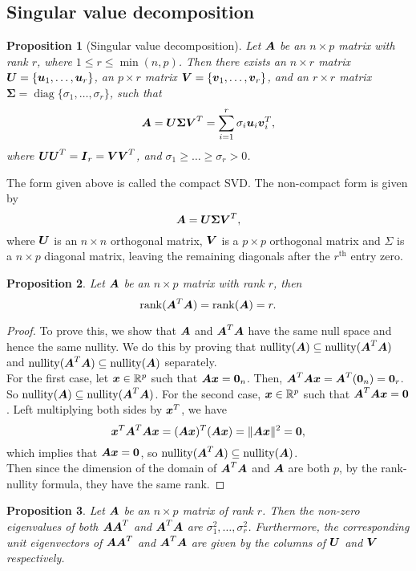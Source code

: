 \documentclass[12pt]{article}
\newtheorem{prop}{Proposition}[section]
\DeclareMathOperator{\rank}{rank}
\DeclareMathOperator{\nul}{nullity}
\DeclareMathOperator{\diag}{diag}
\newcommand{\Sg}{\Sigma}
\begin{document}
	\subsection{Singular value decomposition}
	\begin{prop}[Singular value decomposition]
		Let $\boldsymbol{A}$ be an $n\times p$ matrix with rank $r$, where $1\leq r\leq \min(n,p)$. Then there exists an $n\times r$ matrix $\boldsymbol{U}=\{\boldsymbol{u}_1,\ldots,\boldsymbol{u}_r\}$, an $p\times r$ matrix $\boldsymbol{V}=\{\boldsymbol{v}_1,\ldots,\boldsymbol{v}_r\}$, and an $r\times r$ matrix $\boldsymbol{\Sg}=\diag\{\sigma_1,\ldots,\sigma_r\}$, such that
		$$\bmA=\bmU\boldsymbol{\Sg}\bmV^T=\sum_{i=1}^{r}\sigma_i\bmu_i\bmv_i^T,$$
		where $\boldsymbol{U}\boldsymbol{U}^T=\boldsymbol{I}_r=\boldsymbol{V}\boldsymbol{V}^T$, and $\sigma_1\geq\ldots\geq\sigma_r>0$.
	\end{prop}
	
	The form given above is called the compact SVD. The non-compact form is given by
	$$\bmA=\bmU\boldsymbol{\Sg}\bmV^T,$$
	where $\boldsymbol{U}$ is an $n\times n$ orthogonal matrix, $\boldsymbol{V}$ is a $p\times p$ orthogonal matrix and $\Sg$ is a $n\times p$ diagonal matrix, leaving the remaining diagonals after the $r^{\text{th}}$ entry zero.

	\begin{prop}
		Let $\boldsymbol{A}$ be an $n\times p$ matrix with rank $r$, then 
		$$\rank(\bmA^T\bmA)=\rank(\bmA)=r.$$
	\end{prop}
	
	\begin{proof}
		To prove this, we show that $\boldsymbol{A}$ and $\boldsymbol{A}^T\boldsymbol{A}$ have the same null space and hence the same nullity. We do this by proving that $\nul(\bmA)\subseteq\nul(\bmA^T\bmA)$ and $\nul(\bmA^T\bmA)\subseteq\nul(\bmA)$ separately.\\
		
		For the first case, let $\bmx\in\RR^p$ such that $\boldsymbol{A}\boldsymbol{x}=\textbf{0}_n$. Then, $\boldsymbol{A}^T\boldsymbol{A}\boldsymbol{x}=\boldsymbol{A}^T(\textbf{0}_n)=\textbf{0}_r$. So $\nul(\bmA)\subseteq\nul(\bmA^T\bmA)$. For the second case, $\bmx\in\RR^p$ such that $\boldsymbol{A}^T\boldsymbol{A}\boldsymbol{x}=\textbf{0}$. Left multiplying both sides by $\boldsymbol{x}^T$, we have
		$$\boldsymbol{x}^T\boldsymbol{A}^T\boldsymbol{A}\boldsymbol{x}=(\boldsymbol{A}\boldsymbol{x})^T(\boldsymbol{A}\boldsymbol{x})=\|\boldsymbol{A}\boldsymbol{x}\|^2=\textbf{0},$$
		which implies that $\boldsymbol{A}\boldsymbol{x}=\textbf{0}$, so $\nul(\bmA^T\bmA)\subseteq\nul(\bmA)$.\\

		Then since the dimension of the domain of $\boldsymbol{A}^T\boldsymbol{A}$ and $\boldsymbol{A}$ are both $p$, by the rank-nullity formula, they have the same rank.
	\end{proof}
	
	\begin{prop}\label{prop1}
		Let $\boldsymbol{A}$ be an $n\times p$ matrix of rank $r$. Then the non-zero eigenvalues of both $\boldsymbol{A}\boldsymbol{A}^T$ and $\boldsymbol{A}^T\boldsymbol{A}$ are $\sigma_1^2,\ldots,\sigma_r^2$.
		Furthermore, the corresponding unit eigenvectors of $\boldsymbol{A}\boldsymbol{A}^T$ and $\boldsymbol{A}^T\boldsymbol{A}$ are given by the columns of $\boldsymbol{U}$ and $\boldsymbol{V}$ respectively.
	\end{prop}
	
\end{document}
